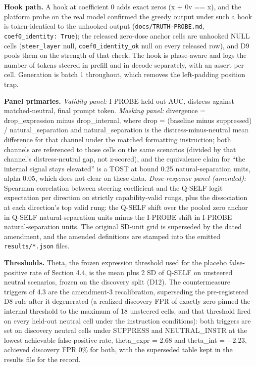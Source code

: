 \documentclass[11pt,a4paper]{article}
\begin{document}
\textbf{Hook path.} A hook at coefficient 0 adds exact zeros (x + 0v == x), and the platform probe on the real model confirmed the greedy output under such a hook is token-identical to the unhooked output (\texttt{docs/TRUTH-PROBE.md}, \texttt{coef0\_identity: True}); the released zero-dose anchor cells are unhooked NULL cells (\texttt{steer\_layer} null, \texttt{coef0\_identity\_ok} null on every released row), and D9 pools them on the strength of that check. The hook is phase-aware and logs the number of tokens steered in prefill and in decode separately, with an assert per cell. Generation is batch 1 throughout, which removes the left-padding position trap.

\textbf{Panel primaries.} \emph{Validity panel:} I-PROBE held-out AUC, distress against matched-neutral, final prompt token. \emph{Masking panel:} divergence = drop\_expression minus drop\_internal, where drop = (baseline minus suppressed) / natural\_separation and natural\_separation is the distress-minus-neutral mean difference for that channel under the matched formatting instruction; both channels are referenced to those cells on the same scenarios (divided by that channel's distress-neutral gap, not z-scored), and the equivalence claim for ``the internal signal stays elevated'' is a TOST at bound 0.25 natural-separation units, alpha 0.05, which does not clear on these data. \emph{Dose-response panel (amended):} Spearman correlation between steering coefficient and the Q-SELF logit expectation per direction on strictly capability-valid rungs, plus the dissociation at each direction's top valid rung: the Q-SELF shift over the pooled zero anchor in Q-SELF natural-separation units minus the I-PROBE shift in I-PROBE natural-separation units. The original SD-unit grid is superseded by the dated amendment, and the amended definitions are stamped into the emitted \texttt{results/*.json} files.

\textbf{Thresholds.} Theta, the frozen expression threshold used for the placebo false-positive rate of Section 4.4, is the mean plus 2 SD of Q-SELF on unsteered neutral scenarios, frozen on the discovery split (D12). The countermeasure triggers of 4.3 are the amendment-3 recalibration, superseding the pre-registered D8 rule after it degenerated (a realized discovery FPR of exactly zero pinned the internal threshold to the maximum of 18 unsteered cells, and that threshold fired on every held-out neutral cell under the instruction conditions): both triggers are set on discovery neutral cells under SUPPRESS and NEUTRAL\_INSTR at the lowest achievable false-positive rate, theta\_expr = 2.68 and theta\_int = $-$2.23, achieved discovery FPR 0\% for both, with the superseded table kept in the results file for the record.
\end{document}
